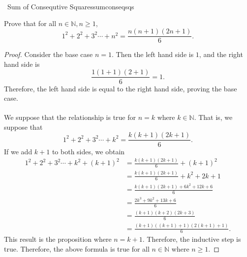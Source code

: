         \begin{example}{\Difficulty\,\Difficulty\,\,Sum of Consequtive Squares}{sumconseqsqs}
        
            Prove that for all \(n\in\mathbb{N}, n \geq 1\),
            \begin{equation*}
                1^2+2^2+3^2\cdots+n^2=\frac{n(n+1)(2n+1)}{6}.
            \end{equation*}
            \begin{proof}
                Consider the base case \(n=1\). Then the left hand side is \(1\), and the right hand side is
                \begin{equation*}
                    \frac{1(1+1)(2+1)}{6}=1.
                \end{equation*}
                Therefore, the left hand side is equal to the right hand side, proving the base case.
                \\
                \\
                We suppose that the relationship is true for \(n=k\) where \(k\in\mathbb{N}\). That is, we suppose that
                \begin{equation*}
                    1^2+2^2+3^2\cdots+k^2=\frac{k(k+1)(2k+1)}{6}.
                \end{equation*}
                If we add \(k+1\) to both sides, we obtain
                \begin{align*}
                    1^2+2^2+3^2\cdots+k^2+(k+1)^2&=\frac{k(k+1)(2k+1)}{6}+(k+1)^2 \\
                    &=\frac{k(k+1)(2k+1)}{6}+k^2+2k+1 \\
                    &=\frac{k(k+1)(2k+1)+6k^2+12k+6}{6} \\
                    &=\frac{2k^3+9k^2+13k+6}{6} \\
                    &=\frac{(k+1)(k+2)(2k+3)}{6} \\
                    &=\frac{(k+1)((k+1)+1)(2(k+1)+1)}{6}.
                \end{align*}
                This result is the proposition where \(n=k+1\). Therefore, the inductive step is true. Therefore, the above formula is true for all \(n\in\mathbb{N}\) where \(n \geq 1\).
            \end{proof}
        
        \end{example}
        \pagebreak
